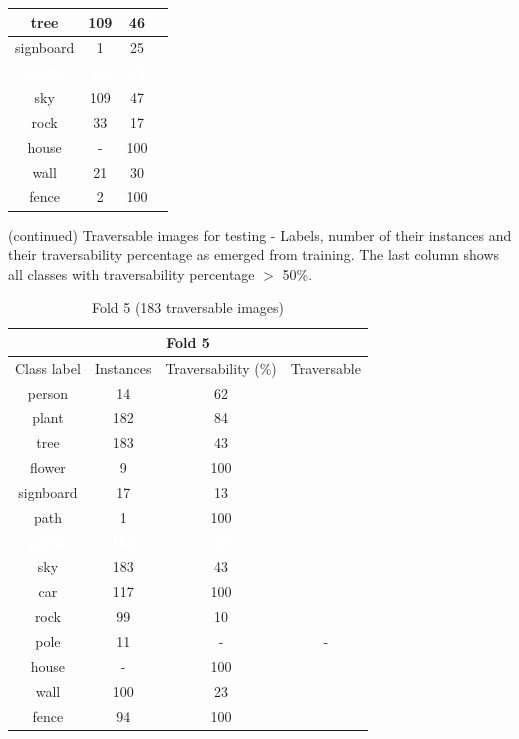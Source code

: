 \documentclass[12pt,a4paper,table,dvipsnames,tikz]{report}
\newcommand{\white}[1]{\textbf{\textcolor{white}{#1}}} %
\begin{document}
\begin{table}[h!]
\begin{subtable}[h!]{\textwidth}
\begin{tabular}{|c|c|c|c|}
				\hline
				\rowcolor{tree}
				tree & 109 & 46 &\\
				\hline
				signboard & 1 & 25 &\\
				\hline
				\rowcolor{earth}
				\white{earth} & \white{83} & \white{48} &\\
				\hline
				\rowcolor{sky}
				sky & 109 & 47 &\\
				\hline
				rock & 33 & 17 &\\
				\hline
				\rowcolor{house}
				house & - & 100 & \checkmark\\
				\hline
				wall & 21 & 30 &\\
				\hline
				fence & 2 & 100 & \checkmark\\
				\hline
			\end{tabular}
			\label{table:trav.f4}
		\end{subtable}
	\end{table}
	
	\begin{table}[h!]
		\ContinuedFloat %
		\caption{(continued) Traversable images for testing - Labels, number of their instances 
			and their traversability percentage as emerged from training. The last column shows 
			all classes with traversability percentage $>$ 50\%.}
		\begin{subtable}[h!]{\textwidth}
			\caption{Fold 5 (183 traversable images)}
			\centering
			\begin{tabular}{|c|c|c|c|}
				\hline
				\multicolumn{4}{|c|}{Fold 5}\\
				\hline
				Class label & Instances & Traversability (\%) & Traversable\\
				\hline\hline
				person & 14 & 62 & \checkmark\\
				\hline		
				plant & 182 & 84 & \checkmark\\
				\hline
				\rowcolor{tree}
				tree & 183 & 43 &\\
				\hline
				flower & 9 & 100 & \checkmark\\
				\hline
				signboard & 17 & 13 &\\
				\hline
				path & 1 & 100 & \checkmark\\
				\hline
				\rowcolor{earth}
				\white{earth} & \white{183} & \white{43} &\\
				\hline
				\rowcolor{sky}
				sky & 183 & 43 &\\
				\hline
				car & 117 & 100 & \checkmark\\
				\hline
				rock & 99 & 10 &\\
				\hline
				pole & 11 & - & -\\
				\hline
				\rowcolor{house}
				house & - & 100 & \checkmark\\
				\hline
				wall & 100 & 23 &\\
				\hline
				fence & 94 & 100 & \checkmark\\
				\hline
			\end{tabular}
			\label{table:trav.f5}
		\end{subtable}
	\end{table}
	
\end{document}
